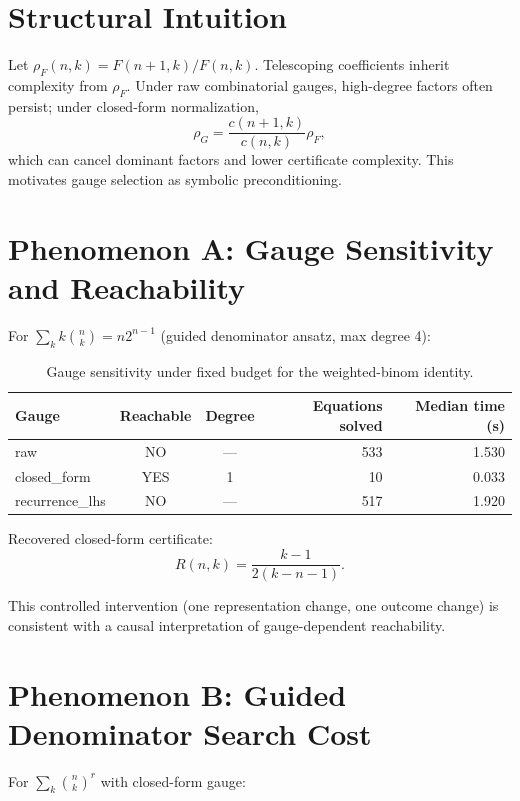 \documentclass[11pt]{article}
\begin{document}
\section{Structural Intuition}
Let $\rho_F(n,k)=F(n+1,k)/F(n,k)$. Telescoping coefficients inherit complexity from $\rho_F$. Under raw combinatorial gauges, high-degree factors often persist; under closed-form normalization,
\[
\rho_G=\frac{c(n+1,k)}{c(n,k)}\rho_F,
\]
which can cancel dominant factors and lower certificate complexity. This motivates gauge selection as symbolic preconditioning.

\section{Phenomenon A: Gauge Sensitivity and Reachability}
For $\sum_k k\binom{n}{k}=n2^{n-1}$ (guided denominator ansatz, max degree 4):

\begin{table}[htbp]
\centering
\small
\begin{tabular}{lccrr}
\toprule
Gauge & Reachable & Degree & {Equations solved} & {Median time (s)} \\
\midrule
raw & NO & --- & 533 & 1.530 \\
closed\_form & YES & 1 & 10 & 0.033 \\
recurrence\_lhs & NO & --- & 517 & 1.920 \\
\bottomrule
\end{tabular}
\caption{Gauge sensitivity under fixed budget for the weighted-binom identity.}
\label{tab:phenomenon-a}
\end{table}

Recovered closed-form certificate:
\[
R(n,k)=\frac{k-1}{2(k-n-1)}.
\]

This controlled intervention (one representation change, one outcome change) is consistent with a causal interpretation of gauge-dependent reachability.

\section{Phenomenon B: Guided Denominator Search Cost}
For $\sum_k \binom{n}{k}^r$ with closed-form gauge:
\end{document}
